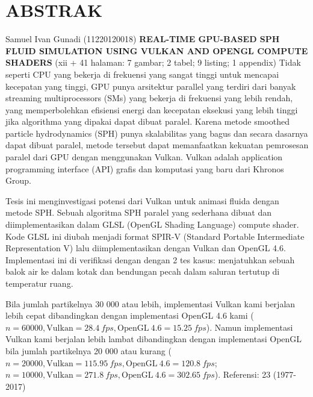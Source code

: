 \documentclass[a4paper, 12pt, oneside]{book}
\begin{document}
\clearpage
\chapter{ABSTRAK}

\begin{singlespace}
    Samuel Ivan Gunadi (11220120018)
    \newline
    {\bfseries\large\centering\MakeTextUppercase{Real-Time GPU-Based SPH Fluid Simulation Using Vulkan and OpenGL Compute Shaders}}
    \newline
    (xii + 41 halaman: 7 gambar; 2 tabel; 9 listing; 1 appendix)
    \vspace{1\baselineskip}
    \newline
    Tidak seperti CPU yang bekerja di frekuensi yang sangat tinggi untuk mencapai kecepatan yang tinggi, GPU punya arsitektur parallel yang terdiri dari banyak streaming multiprocessors (SMs) yang bekerja di frekuensi yang lebih rendah, yang memperbolehkan efisiensi energi dan kecepatan eksekusi yang lebih tinggi jika algorithma yang dipakai dapat dibuat paralel. Karena metode smoothed particle hydrodynamics (SPH) punya skalabilitas yang bagus dan secara dasarnya dapat dibuat paralel, metode tersebut dapat memanfaatkan kekuatan pemrosesan paralel dari GPU dengan menggunakan Vulkan. Vulkan adalah application programming interface (API) grafis dan komputasi yang baru dari Khronos Group.
    
    Tesis ini menginvestigasi potensi dari Vulkan untuk animasi fluida dengan metode SPH. Sebuah algoritma SPH paralel yang sederhana dibuat dan diimplementasikan dalam GLSL (OpenGL Shading Language) compute shader. Kode GLSL ini diubah menjadi format SPIR-V (Standard Portable Intermediate Representation V) lalu diimplementasikan dengan Vulkan dan OpenGL 4.6. Implementasi ini di verifikasi dengan dengan 2 tes kasus: menjatuhkan sebuah balok air ke dalam kotak dan bendungan pecah dalam saluran tertutup di temperatur ruang.
    
    Bila jumlah partikelnya 30 000 atau lebih, implementasi Vulkan kami berjalan lebih cepat dibandingkan dengan implementasi OpenGL 4.6 kami (\(n = 60 000, \mathrm{Vulkan} = \SI{28.4}{fps}, \mathrm{OpenGL\ 4.6} = \SI{15.25}{fps}\)). Namun implementasi Vulkan kami berjalan lebih lambat dibandingkan dengan implementasi OpenGL bila jumlah partikelnya 20 000 atau kurang (\(n = 20000, \mathrm{Vulkan} = \SI{115.95}{fps}, \mathrm{OpenGL\ 4.6} = \SI{120.8}{fps}\); \(n = 10000, \mathrm{Vulkan} = \SI{271.8}{fps}, \mathrm{OpenGL\ 4.6} = \SI{302.65}{fps}\)).
    \vspace{1\baselineskip}
    \newline
    Referensi: 23 (1977-2017)
\end{singlespace}
\end{document}

